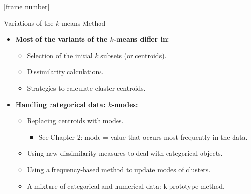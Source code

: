 \documentclass[aspectratio=169,t,xcolor=dvipsnames]{beamer}
\begin{document}
  {
    [frame number]
    \begin{frame}{Variations of the $k$-means Method}
      \begin{itemize}
        \item \textbf{Most of the variants of the $k$-means differ in:}
        \begin{itemize}
          \item Selection of the initial $k$ subsets (or centroids).
          \item Dissimilarity calculations.
          \item Strategies to calculate cluster centroids.
        \end{itemize}
        \item \textbf{Handling categorical data: $k$-modes:}
        \begin{itemize}
          \item Replacing centroids with modes.
          \begin{itemize}
            \item See Chapter 2: mode = value that occurs most frequently in the data.
          \end{itemize}
          \item Using new dissimilarity measures to deal with categorical objects.
          \item Using a frequency-based method to update modes of clusters.
          \item A mixture of categorical and numerical data: k-prototype method.
        \end{itemize}
      \end{itemize}
    \end{frame}
  }
\end{document}
